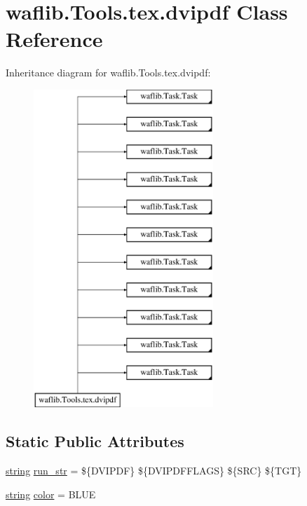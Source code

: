 \hypertarget{classwaflib_1_1_tools_1_1tex_1_1dvipdf}{}\section{waflib.\+Tools.\+tex.\+dvipdf Class Reference}
\label{classwaflib_1_1_tools_1_1tex_1_1dvipdf}
Inheritance diagram for waflib.\+Tools.\+tex.\+dvipdf\+:\begin{figure}[H]
\begin{center}
\leavevmode
\includegraphics[height=12.000000cm]{classwaflib_1_1_tools_1_1tex_1_1dvipdf}
\end{center}
\end{figure}
\subsection*{Static Public Attributes}
\begin{DoxyCompactItemize}
\item 
\hyperlink{test__lib_f_l_a_c_2format_8c_ab02026ad0de9fb6c1b4233deb0a00c75}{string} \hyperlink{classwaflib_1_1_tools_1_1tex_1_1dvipdf_a7f951090524b0cb4ac5f625780541665}{run\+\_\+str} = \textquotesingle{}\$\{D\+V\+I\+P\+DF\} \$\{D\+V\+I\+P\+D\+F\+F\+L\+A\+GS\} \$\{S\+RC\} \$\{T\+GT\}\textquotesingle{}
\item 
\hyperlink{test__lib_f_l_a_c_2format_8c_ab02026ad0de9fb6c1b4233deb0a00c75}{string} \hyperlink{classwaflib_1_1_tools_1_1tex_1_1dvipdf_a89bece1bbcae034b108fb52b7e3995f5}{color} = \textquotesingle{}B\+L\+UE\textquotesingle{}
\end{DoxyCompactItemize}
